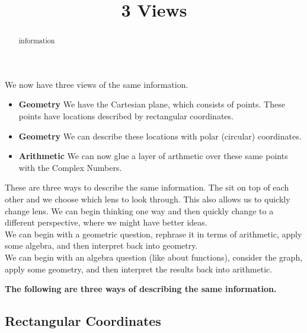 \documentclass{ximera}
\title{3 Views}
\begin{document}
\begin{abstract}
information
\end{abstract}
\maketitle




We now have three views of the same information.



\begin{itemize}
\item \textbf{\textcolor{purple!85!blue}{Geometry}} We have the Cartesian plane, which consists of points.  These points have locations described by rectangular coordinates. \\

\item \textbf{\textcolor{purple!85!blue}{Geometry}} We can describe these locations with polar (circular) coordinates. \\

\item \textbf{\textcolor{purple!85!blue}{Arithmetic}} We can now glue a layer of arthmetic over these same points with the Complex Numbers.
\end{itemize}


These are three ways to describe the same information.  The sit on top of each other and we choose which lens to look through.  This also allows us to quickly change lens.  We can begin thinking one way and then quickly change to a different perspective, where we might have better ideas. \\

We can begin with a geometric question, rephrase it in terms of arithmetic, apply some algebra, and then interpret back into geometry. \\

We can begin with an algebra question (like about functions), consider the graph, apply some geometry, and then interpret the results back into arithmetic.  \\


\qquad



\textbf{\textcolor{blue!55!black}{The following are three ways of describing the same information.}} \\

\qquad

\subsection*{Rectangular Coordinates} 
\end{document}
